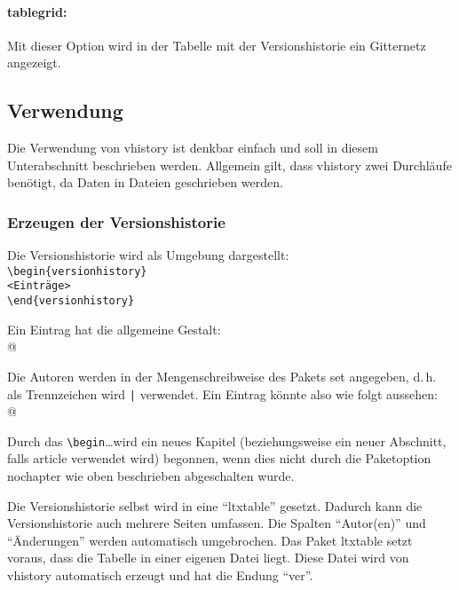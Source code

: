 \paragraph{tablegrid:} Mit dieser Option wird in der Tabelle mit der Versionshistorie ein Gitternetz angezeigt.

\subsection{Verwendung}\label{verwendung}
Die Verwendung von vhistory ist denkbar einfach und soll in diesem Unterabschnitt beschrieben werden. Allgemein gilt, dass vhistory zwei Durchläufe benötigt, da Daten in Dateien geschrieben werden.

\subsubsection{Erzeugen der Versionshistorie}\label{begin}
Die Versionshistorie wird als Umgebung dargestellt:\\
\mbox{}\hspace{2em}\verb|\begin{versionhistory}|\\
\mbox{}\hspace{2em}\verb|<Einträge>|\\
\mbox{}\hspace{2em}\verb|\end{versionhistory}|

Ein Eintrag hat die allgemeine Gestalt:\\
\mbox{}\hspace{2em}\verb@{}@

Die Autoren werden in der Mengenschreibweise des Pakets set angegeben, d.\,h. als Trennzeichen wird \texttt{|} verwendet. Ein Eintrag könnte also wie folgt aussehen:\\
\mbox{}\hspace{2em}\verb@{}@

Durch das \verb|\begin|\ldots wird ein neues Kapitel (beziehungsweise ein neuer Abschnitt, falls article verwendet wird) begonnen, wenn dies nicht durch die Paketoption nochapter wie oben beschrieben abgeschalten wurde.

Die Versionshistorie selbst wird in eine "`ltxtable"' gesetzt. Dadurch kann die Versionshistorie auch mehrere Seiten umfassen. Die Spalten "`Autor(en)"' und "`Änderungen"' werden automatisch umgebrochen. Das Paket ltxtable setzt voraus, dass die Tabelle in einer eigenen Datei liegt. Diese Datei wird von vhistory automatisch erzeugt und hat die Endung "`ver"'.

